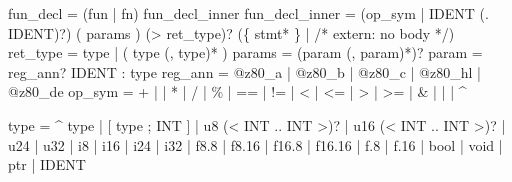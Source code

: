 \documentclass[
  11pt,
  a4paper,
]{report}
\newenvironment{Shaded}{\begin{snugshade}\small}{\end{snugshade}}
\newcommand{\NormalTok}[1]{#1}
\begin{document}
\begin{Shaded}
\begin{Highlighting}[]
\NormalTok{fun\_decl       = (\textquotesingle{}fun\textquotesingle{} | \textquotesingle{}fn\textquotesingle{}) fun\_decl\_inner}
\NormalTok{fun\_decl\_inner = (op\_sym | IDENT (\textquotesingle{}.\textquotesingle{} IDENT)?) \textquotesingle{}(\textquotesingle{} params \textquotesingle{})\textquotesingle{} (\textquotesingle{}{-}\textgreater{}\textquotesingle{} ret\_type)?}
\NormalTok{                 (\textquotesingle{}\{\textquotesingle{} stmt* \textquotesingle{}\}\textquotesingle{} | /* extern: no body */)}
\NormalTok{ret\_type       = type | \textquotesingle{}(\textquotesingle{} type (\textquotesingle{},\textquotesingle{} type)* \textquotesingle{})\textquotesingle{}}
\NormalTok{params         = (param (\textquotesingle{},\textquotesingle{} param)*)?}
\NormalTok{param          = reg\_ann? IDENT \textquotesingle{}:\textquotesingle{} type}
\NormalTok{reg\_ann        = \textquotesingle{}@z80\_a\textquotesingle{} | \textquotesingle{}@z80\_b\textquotesingle{} | \textquotesingle{}@z80\_c\textquotesingle{} | \textquotesingle{}@z80\_hl\textquotesingle{} | \textquotesingle{}@z80\_de\textquotesingle{}}
\NormalTok{op\_sym         = \textquotesingle{}+\textquotesingle{} | \textquotesingle{}{-}\textquotesingle{} | \textquotesingle{}*\textquotesingle{} | \textquotesingle{}/\textquotesingle{} | \textquotesingle{}\%\textquotesingle{} | \textquotesingle{}==\textquotesingle{} | \textquotesingle{}!=\textquotesingle{} | \textquotesingle{}\textless{}\textquotesingle{} | \textquotesingle{}\textless{}=\textquotesingle{}}
\NormalTok{               | \textquotesingle{}\textgreater{}\textquotesingle{} | \textquotesingle{}\textgreater{}=\textquotesingle{} | \textquotesingle{}\&\textquotesingle{} | \textquotesingle{}|\textquotesingle{} | \textquotesingle{}\^{}\textquotesingle{}}

\NormalTok{type           = \textquotesingle{}\^{}\textquotesingle{} type}
\NormalTok{               | \textquotesingle{}[\textquotesingle{} type \textquotesingle{};\textquotesingle{} INT \textquotesingle{}]\textquotesingle{}}
\NormalTok{               | \textquotesingle{}u8\textquotesingle{} (\textquotesingle{}\textless{}\textquotesingle{} INT \textquotesingle{}..\textquotesingle{} INT \textquotesingle{}\textgreater{}\textquotesingle{})?}
\NormalTok{               | \textquotesingle{}u16\textquotesingle{} (\textquotesingle{}\textless{}\textquotesingle{} INT \textquotesingle{}..\textquotesingle{} INT \textquotesingle{}\textgreater{}\textquotesingle{})?}
\NormalTok{               | \textquotesingle{}u24\textquotesingle{} | \textquotesingle{}u32\textquotesingle{} | \textquotesingle{}i8\textquotesingle{} | \textquotesingle{}i16\textquotesingle{} | \textquotesingle{}i24\textquotesingle{} | \textquotesingle{}i32\textquotesingle{}}
\NormalTok{               | \textquotesingle{}f8.8\textquotesingle{} | \textquotesingle{}f8.16\textquotesingle{} | \textquotesingle{}f16.8\textquotesingle{} | \textquotesingle{}f16.16\textquotesingle{} | \textquotesingle{}f.8\textquotesingle{} | \textquotesingle{}f.16\textquotesingle{}}
\NormalTok{               | \textquotesingle{}bool\textquotesingle{} | \textquotesingle{}void\textquotesingle{} | \textquotesingle{}ptr\textquotesingle{}}
\NormalTok{               | IDENT}


\end{Highlighting}
\end{Shaded}
\end{document}
